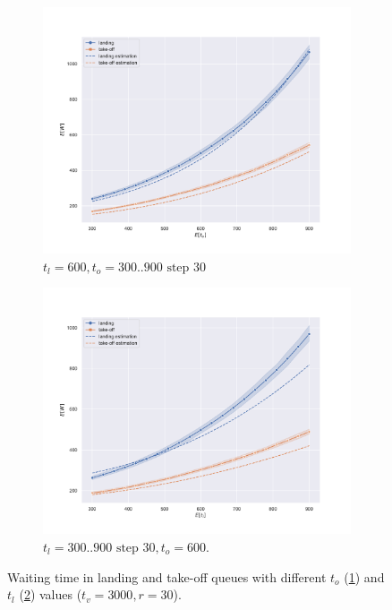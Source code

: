 \documentclass[12pt]{article}
\begin{document}
\begin{figure}
	\centering
	\begin{subfigure}[b]{.49\linewidth}
		\includegraphics[width=\textwidth]{report/immagini/queues_tt.pdf}
    	\caption{$t_l = 600, t_o = 300..900 \text{ step } 30$}
    	\label{queues-tt}
	\end{subfigure}
	\begin{subfigure}[b]{.49\linewidth}
		\includegraphics[width=\textwidth]{report/immagini/queues_lt.pdf}
    	\caption{$t_l = 300..900 \text{ step } 30, t_o = 600$.}
    	\label{queues-lt}
	\end{subfigure}
	\caption{Waiting time in landing and take-off queues with different $t_o$ (\ref{queues-tt}) and $t_l$ (\ref{queues-lt}) values ($t_v = 3000, r = 30$).}
	\label{queues}
\end{figure}
\end{document}
